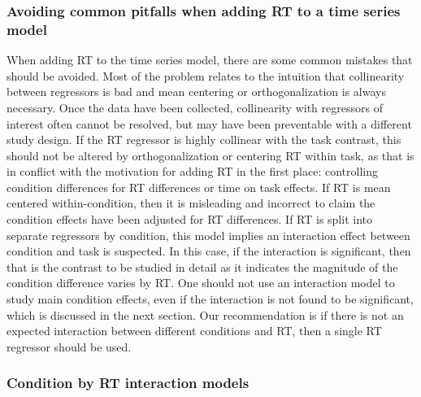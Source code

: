 \documentclass[titlepage,12pt] {article}
\begin{document}
\subsubsection*{Avoiding common pitfalls when adding RT to a time series model}
When adding RT to the time series model, there are some  common mistakes that should be avoided.  Most of the problem relates to the intuition that collinearity between regressors is bad and mean centering or orthogonalization is always necessary.  Once the data have been collected, collinearity with regressors of interest often cannot be resolved, but may have been preventable with a different study design.  If the RT regressor is highly collinear with the task contrast, this should not be altered by orthogonalization or centering RT within task, as that is in conflict with the motivation for adding RT in the first place: controlling condition differences for RT differences or time on task effects.  If RT is mean centered within-condition, then it is misleading and incorrect to claim the condition effects have been adjusted for RT differences.  If RT is split into separate regressors by condition, this model implies an interaction effect between condition and task is suspected.  In this case, if the interaction is significant, then that is the contrast to be studied in detail as it indicates the magnitude of the condition difference varies by  RT.  One should not use an interaction model to study main condition effects, even if the interaction is not found to be significant, which is discussed in the next section.  Our recommendation is if there is not an expected interaction between different conditions and RT, then a single RT regressor should be used.  


\subsubsection*{Condition by RT interaction models}
\end{document}
